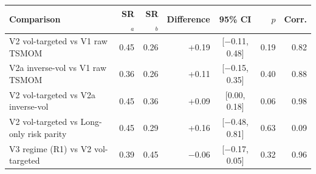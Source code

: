 \begin{tabular}{lrrrcrr}
\toprule
Comparison & SR$_a$ & SR$_b$ & Difference & 95\% CI & $p$ & Corr. \\
\midrule
V2 vol-targeted vs V1 raw TSMOM & 0.45 & 0.26 & +0.19 & [$-$0.11, 0.48] & 0.19 & 0.82 \\
V2a inverse-vol vs V1 raw TSMOM & 0.36 & 0.26 & +0.11 & [$-$0.15, 0.35] & 0.40 & 0.88 \\
V2 vol-targeted vs V2a inverse-vol & 0.45 & 0.36 & +0.09 & [0.00, 0.18] & 0.06 & 0.98 \\
V2 vol-targeted vs Long-only risk parity & 0.45 & 0.29 & +0.16 & [$-$0.48, 0.81] & 0.63 & 0.09 \\
V3 regime (R1) vs V2 vol-targeted & 0.39 & 0.45 & $-$0.06 & [$-$0.17, 0.05] & 0.32 & 0.96 \\
\bottomrule
\end{tabular}
